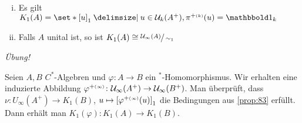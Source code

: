 \begin{bemerkung}[label=bem:84]
	\begin{enumerate}[(i)]
		\item Es gilt $K_1(A) = \set*{\benbrace*{u}_1 \given u \in \mathcal{U}_k(A^+), \pi^{+\ssbrace{k}}(u) =\ind_k}$
		\item Falls $A$ unital ist, so ist $K_1(A) \cong \sfrac{\mathcal{U}_\infty(A)}{\sim_1}$
	\end{enumerate}
\end{bemerkung}
\begin{beweis}
	\emph{Übung!}
\end{beweis}

Seien $A,B$ $C^*$-Algebren und $\varphi \colon A \to B$ ein $^*$-Homomorphismus.
Wir erhalten eine induzierte Abbildung $\varphi^{+\ssbrace{\infty}} \colon \mathcal{U}_\infty(A^+) \to \mathcal{U}_\infty(B^+)$.
Man überprüft, dass $\nu \colon U_\infty(A^+) \to K_1(B)$, $u \mapsto \benbrace*{\varphi^{+\ssbrace{\infty}}(u)}_1$ die Bedingungen aus \autoref{prop:83} erfüllt.
Dann erhält man $K_1(\varphi) \colon K_1(A) \to K_1(B)$.

